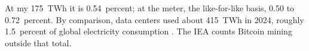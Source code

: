 At my 175~TWh it is 0.54~percent; at the meter, the like-for-like basis, 0.50 to 0.72~percent. %
By comparison, data centers used about 415~TWh in 2024, roughly 1.5~percent of global electricity consumption \autocite{IEADataCenters}. The IEA counts Bitcoin mining outside that total. %
